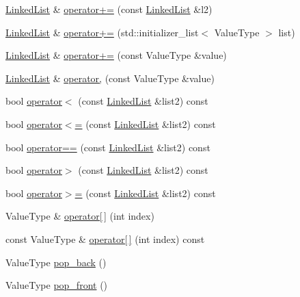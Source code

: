 \begin{DoxyCompactItemize}
\item 
\mbox{\hyperlink{classLinkedList}{Linked\+List}} \& \mbox{\hyperlink{classLinkedList_ae07506d03c2a077c0ade134416371c78}{operator+=}} (const \mbox{\hyperlink{classLinkedList}{Linked\+List}} \&l2)
\item 
\mbox{\hyperlink{classLinkedList}{Linked\+List}} \& \mbox{\hyperlink{classLinkedList_a7c08c1a4983616294a10bbbf43d3f8df}{operator+=}} (std\+::initializer\+\_\+list$<$ Value\+Type $>$ list)
\item 
\mbox{\hyperlink{classLinkedList}{Linked\+List}} \& \mbox{\hyperlink{classLinkedList_a032d4f974bb2083db2bab6a4e8e6f248}{operator+=}} (const Value\+Type \&value)
\item 
\mbox{\hyperlink{classLinkedList}{Linked\+List}} \& \mbox{\hyperlink{classLinkedList_a01622233116ad1ae4333e3e1ed1f7ca5}{operator,}} (const Value\+Type \&value)
\item 
bool \mbox{\hyperlink{classLinkedList_a1622208b00e2ffcf2ad120c1d748c784}{operator$<$}} (const \mbox{\hyperlink{classLinkedList}{Linked\+List}} \&list2) const
\item 
bool \mbox{\hyperlink{classLinkedList_ac25ce8222d0af74f8052d4106ec83cd0}{operator$<$=}} (const \mbox{\hyperlink{classLinkedList}{Linked\+List}} \&list2) const
\item 
bool \mbox{\hyperlink{classLinkedList_a1000d6e937d2d5418896a1d572ced7b3}{operator==}} (const \mbox{\hyperlink{classLinkedList}{Linked\+List}} \&list2) const
\item 
bool \mbox{\hyperlink{classLinkedList_a7f2ff58a4330c932a1169f3afe73643f}{operator$>$}} (const \mbox{\hyperlink{classLinkedList}{Linked\+List}} \&list2) const
\item 
bool \mbox{\hyperlink{classLinkedList_aa512181cce227d2c83263f76d614ee65}{operator$>$=}} (const \mbox{\hyperlink{classLinkedList}{Linked\+List}} \&list2) const
\item 
Value\+Type \& \mbox{\hyperlink{classLinkedList_a7dbb3a92c8b6a08a04b564aed136b870}{operator\mbox{[}$\,$\mbox{]}}} (int index)
\item 
const Value\+Type \& \mbox{\hyperlink{classLinkedList_a1b5a4ea461655cbe512ab976aad8d809}{operator\mbox{[}$\,$\mbox{]}}} (int index) const
\item 
Value\+Type \mbox{\hyperlink{classLinkedList_ab48f65e37130b674bc0f6220cbb59491}{pop\+\_\+back}} ()
\item 
Value\+Type \mbox{\hyperlink{classLinkedList_aacdba74afa1be07d1046ece9e0512c77}{pop\+\_\+front}} ()
\item 

\end{DoxyCompactItemize}
